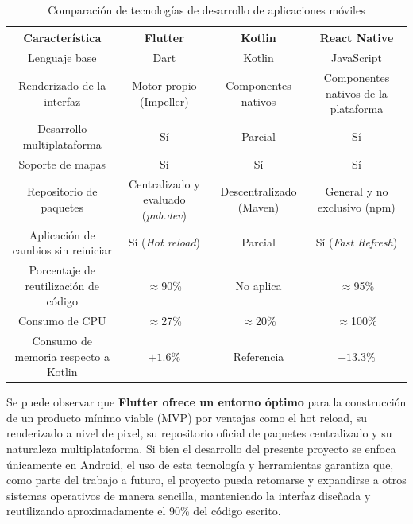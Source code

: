 \begin{table}[htbp]
\centering
\footnotesize
\caption{Comparación de tecnologías de desarrollo de aplicaciones móviles}
\label{tab:tabla-comparativa-framework}
\begin{tabularx}{\textwidth}{ |C|C|C|C| }
\hline
\textbf{Característica} &
\textbf{Flutter} &
\textbf{Kotlin} &
\textbf{React Native}
\\ \hline
Lenguaje base &
Dart \cite{flutter_businessvalue} &
Kotlin \cite{kotlin_docs}&
JavaScript \cite{reactnative_docs}
\\ \hline
Renderizado de la interfaz &
Motor propio (Impeller) \cite{flutter_businessvalue} &
Componentes nativos \cite{kotlin_docs} &
Componentes nativos de la plataforma \cite{reactnative_docs}
\\ \hline
Desarrollo multiplataforma &
Sí \cite{flutter_businessvalue} &
Parcial \cite{kotlin_docs} &
Sí \cite{reactnative_docs}
\\ \hline
Soporte de mapas &
Sí \cite{pub_dev} & 
Sí \cite{google_maps_compose_codelab} & 
Sí \cite{react_native_maps}
\\ \hline
Repositorio de paquetes &
Centralizado y evaluado (\textit{pub.dev}) \cite{pub_dev} &
Descentralizado (Maven) \cite{kotlin_docs} &
General y no exclusivo (npm) \cite{reactnative_docs}
\\ \hline
Aplicación de cambios sin reiniciar &
Sí (\textit{Hot reload}) \cite{flutter_businessvalue} &
Parcial \cite{kotlin_docs} &
Sí (\textit{Fast Refresh}) \cite{reactnative_docs}
\\ \hline
Porcentaje de reutilización de código &
$\approx$90\% \cite{suri2022cross} &
No aplica &
$\approx$95\% \cite{suri2022cross}
\\ \hline
Consumo de CPU &
$\approx$27\% \cite{suri2022cross} &
$\approx$20\% \cite{suri2022cross} &
$\approx$100\% \cite{suri2022cross}
\\ \hline
Consumo de memoria respecto a Kotlin &
$+1.6\%$ \cite{suri2022cross} &
Referencia &
$+13.3\%$ \cite{suri2022cross}
\\ \hline
\end{tabularx}
\end{table}

Se puede observar que \textbf{Flutter ofrece un entorno óptimo} para la construcción de un producto mínimo viable (MVP) por ventajas como el hot reload, su renderizado a nivel de pixel, su repositorio oficial de paquetes centralizado y su naturaleza multiplataforma. Si bien el desarrollo del presente proyecto se enfoca únicamente en Android, el uso de esta tecnología y herramientas garantiza que, como parte del trabajo a futuro, el proyecto pueda retomarse y expandirse a otros sistemas operativos de manera sencilla, manteniendo la interfaz diseñada y reutilizando aproximadamente el 90\% del código escrito\cite{suri2022cross}.

